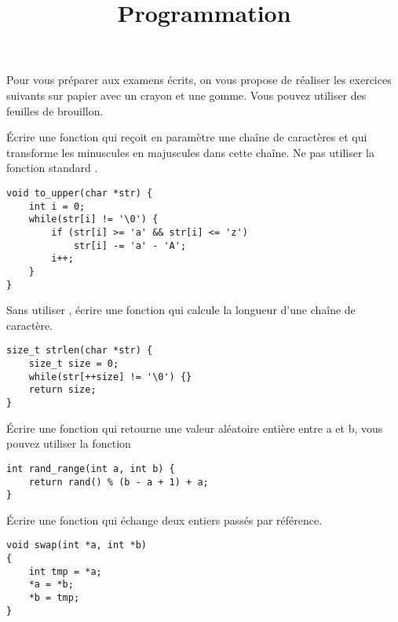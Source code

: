 \documentclass[french,a4paper,addpoints,11pt]{exam}
\title{Programmation}
\begin{document}
\maketitle

Pour vous préparer aux examens écrits, on vous propose de réaliser les exercices suivants sur papier avec un crayon et une gomme. Vous pouvez utiliser des feuilles de brouillon.

\begin{questions}

\question Écrire une fonction qui reçoit en paramètre une chaîne de caractères et qui transforme les minuscules en majuscules dans cette chaîne. Ne pas utiliser la fonction standard .

\begin{solutionordottedlines}[6cm]
\begin{lstlisting}
void to_upper(char *str) {
    int i = 0;
    while(str[i] != '\0') {
        if (str[i] >= 'a' && str[i] <= 'z')
            str[i] -= 'a' - 'A';
        i++;
    }
}
\end{lstlisting}
\end{solutionordottedlines}

\question Sans utiliser , écrire une fonction qui calcule la longueur d'une chaîne de caractère.

\begin{solutionordottedlines}[5cm]
\begin{lstlisting}
size_t strlen(char *str) {
    size_t size = 0;
    while(str[++size] != '\0') {}
    return size;
}
\end{lstlisting}
\end{solutionordottedlines}

\question Écrire une fonction qui retourne une valeur aléatoire entière entre a et b, vous pouvez utiliser la fonction 

\begin{solutionordottedlines}[3cm]
\begin{lstlisting}
int rand_range(int a, int b) {
    return rand() % (b - a + 1) + a;
}
\end{lstlisting}
\end{solutionordottedlines}

\question Écrire une fonction qui échange deux entiers passés par référence.

\begin{solutionordottedlines}[7cm]
\begin{lstlisting}
void swap(int *a, int *b)
{
    int tmp = *a;
    *a = *b;
    *b = tmp;
}
\end{lstlisting}
\end{solutionordottedlines}


\end{questions}
\end{document}
